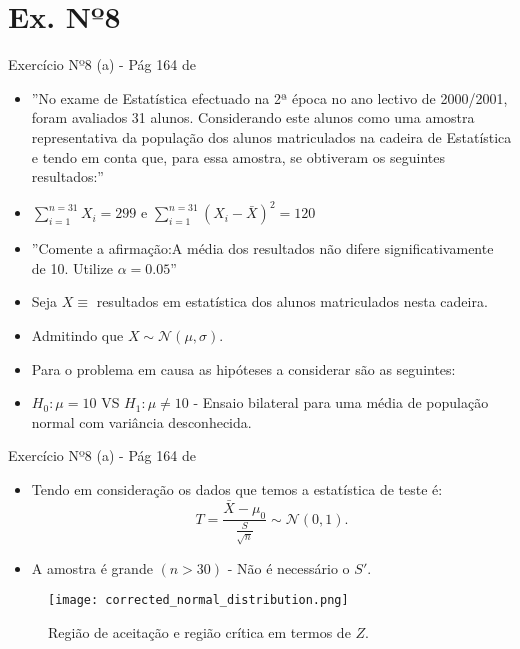 \documentclass[10,5pt, pdf]{beamer}
\begin{document}
\section{Ex. Nº8}\label{sec:ex8}
\begin{frame}{Exercício Nº8 (a) - Pág 164 de \cite{reis2021}}
\begin{itemize}
\item{''No exame de Estatística efectuado na 2ª época no ano lectivo de 2000/2001, foram avaliados 31 alunos. Considerando este alunos como uma amostra representativa da população dos alunos matriculados na cadeira de Estatística e tendo em conta que, para essa amostra, se obtiveram os seguintes resultados:''}
\pause
\item{$\sum_{i=1}^{n=31}X_i=299$ e $\sum_{i=1}^{n=31}(X_i-\bar{X})^2=120$}
\pause
\item{''Comente a afirmação:A média dos resultados não difere significativamente de 10. Utilize $\alpha=0.05$''}
\pause
\item{Seja $X\equiv$ resultados em estatística dos alunos matriculados nesta cadeira.}
\pause
\item{Admitindo que $X\sim \mathcal{N}(\mu, \sigma)$.}
\item{Para o problema em causa as hipóteses a considerar são as seguintes:}
\item{$H_0:\mu=10$ VS $H_1:\mu\neq10$ - Ensaio bilateral para uma média de população normal com variância desconhecida.}
\end{itemize}
\end{frame}


\begin{frame}{Exercício Nº8 (a) - Pág 164 de \cite{reis2021}}
\begin{itemize}
\item{Tendo em consideração os dados que temos a estatística de teste é:}
\pause
\begin{equation}
    T=\frac{\bar{X} - \mu_0}{\frac{S}{\sqrt{n}}}\sim \mathcal{N}(0,1).
\end{equation}
\pause
\item{A amostra é grande $(n>30)$ - Não é necessário o $S'$.}
\end{itemize}
\pause
\begin{figure}
    \centering
    \texttt{[image: corrected\_normal\_distribution.png]}
    \caption{Região de aceitação e região crítica em termos de $Z$.}
\end{figure}
\end{frame}
\end{document}
